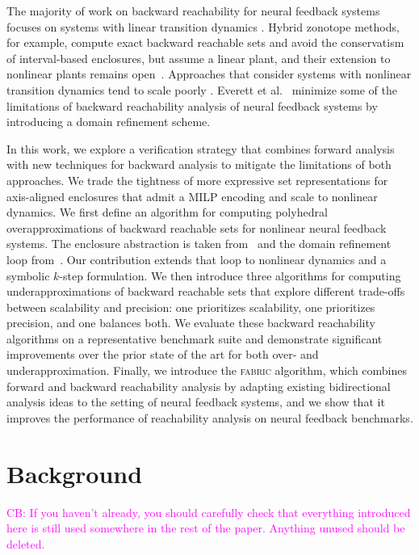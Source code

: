 \documentclass[letterpaper, 10 pt, conference]{ieeeconf}  %
\newcommand{\cb}[1]{\noindent\textcolor{magenta}{\newline CB: #1}}
\newcommand{\cb}[1]{}
\begin{document}
The majority of work on backward reachability for neural feedback systems focuses on systems with
linear transition dynamics \cite{rober2023backward,zhang2023backward}. Hybrid zonotope methods, for example, compute exact backward reachable sets and avoid the conservatism of interval-based enclosures, but assume a linear plant, and their extension to nonlinear plants remains open~\cite{zhang2024reachability}. Approaches that consider systems
with nonlinear transition dynamics tend to scale poorly \cite{rober2023backward}. Everett et al.~\cite{everett2023drip} minimize some
of the limitations of backward reachability analysis of neural feedback systems by introducing a domain refinement scheme. 

In this work, we explore a verification strategy that combines forward analysis with new techniques for backward analysis to mitigate the limitations of both approaches. We trade the tightness of more expressive set representations for axis-aligned enclosures that admit a MILP encoding and scale to nonlinear dynamics. We first define an algorithm for computing polyhedral overapproximations of backward reachable sets for nonlinear neural feedback systems. The enclosure abstraction is taken from~\cite{akinwande2025verifying} and the domain refinement loop from~\cite{everett2023drip}. Our contribution extends that loop to nonlinear dynamics and a symbolic $k$-step formulation. We then introduce three algorithms for computing underapproximations of backward reachable sets that explore different trade-offs between scalability and precision: one prioritizes scalability, one prioritizes precision, and one balances both. We evaluate these backward reachability algorithms on a representative benchmark suite and demonstrate significant improvements over the prior state of the art for both over- and underapproximation. Finally, we introduce the \textsc{fabric} algorithm, which combines forward and backward reachability analysis by adapting existing bidirectional analysis ideas to the setting of neural feedback systems, and we show that it improves the performance of reachability analysis on neural feedback benchmarks.
\section{Background}
\label{sec:background}
\cb{If you haven't already, you should carefully check that everything introduced here is still used somewhere in the rest of the paper.  Anything unused should be deleted.}
\end{document}
